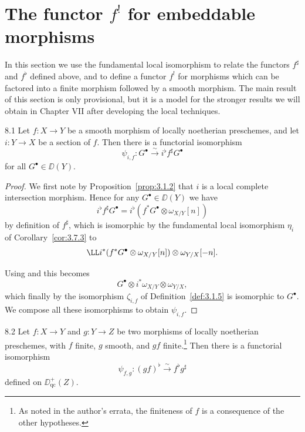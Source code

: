 \section{The functor \texorpdfstring{$f^!$}{f!} for embeddable morphisms}\label{sec:3.8}

In this section we use the fundamental local isomorphism to relate the functors $f^{\sharp}$ and $f^{\flat}$ defined above, and to define a functor $f^!$ for morphisms which can be factored into a finite morphism followed by a smooth morphism. The main result of this section is only provisional, but it is a model for the stronger results we will obtain in Chapter VII after developing the local techniques.

\begin{booklemma}{8.1}\label{lem:3.8.1}
Let $f\colon X\to Y$ be a smooth morphism of locally noetherian preschemes, and let $i\colon Y\to X$ be a section of $f$. Then there is a functorial isomorphism
\[
\psi_{i,f}\colon G^\bullet \xrightarrow{\sim} i^{\flat}f^{\sharp}G^\bullet
\]
for all $G^\bullet\in\DD(Y)$.
\end{booklemma}

\begin{proof}
We first note by Proposition~\ref{prop:3.1.2} that $i$ is a local complete intersection morphism. Hence for any $G^\bullet\in\DD(Y)$ we have
\[
i^{\flat}f^{\sharp}G^\bullet = i^{\flat}(f^*G^\bullet\otimes\omega_{X/Y}[n])
\]
by definition of $f^{\sharp}$, which is isomorphic by the fundamental local isomorphism $\eta_i$ of Corollary~\ref{cor:3.7.3} to
\[
\LL i^*(f^*G^\bullet\otimes\omega_{X/Y}[n])\otimes\omega_{Y/X}[-n].
\]

Using  and  this becomes
\[
G^\bullet \otimes i^*\omega_{X/Y}\otimes\omega_{Y/X},
\]
which finally by the isomorphism $\zeta_{i,f}$ of Definition~\ref{def:3.1.5} is isomorphic to $G^\bullet$. We compose all these isomorphisms to obtain $\psi_{i,f}$.
\end{proof}

\begin{bookproposition}{8.2}\label{prop:3.8.2}
Let $f\colon X\to Y$ and $g\colon Y\to Z$ be two morphisms of locally noetherian preschemes, with $f$ finite, $g$ smooth, and $gf$ finite.\footnote{As noted in the author's errata, the finiteness of $f$ is a consequence of the other hypotheses.} Then there is a functorial isomorphism
\[
\psi_{f,g}\colon (gf)^{\flat} \xrightarrow{\sim} f^{\flat}g^{\sharp}
\]
defined on $\DD_{\mathrm{qc}}^+(Z)$.
\end{bookproposition}

